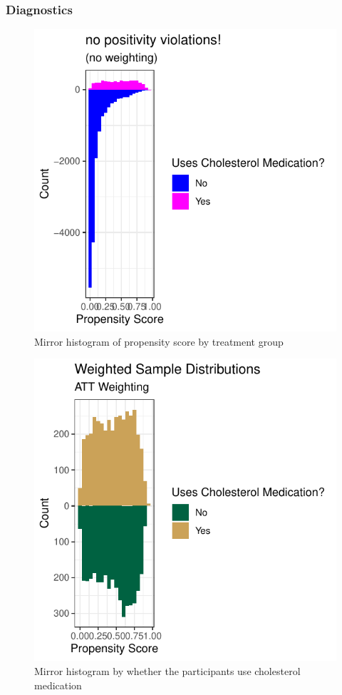 \documentclass[useAMS,usenatbib,referee]{biom}
\begin{document}
\hypertarget{diagnostics}{%
\subsubsection{Diagnostics}\label{diagnostics}}

\begin{figure}
\centering
\includegraphics{final-project_files/figure-latex/fig_diag1-1.pdf}
\caption{Mirror histogram of propensity score by treatment group}
\end{figure}

\begin{figure}
\centering
\includegraphics{final-project_files/figure-latex/fig_diag2-1.pdf}
\caption{Mirror histogram by whether the participants use cholesterol
medication}
\end{figure}
\end{document}
